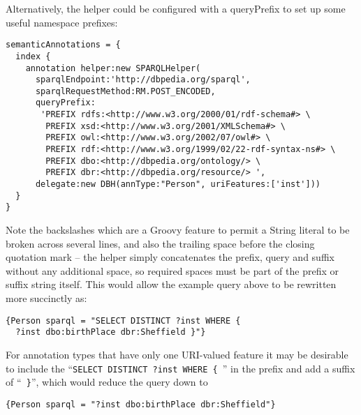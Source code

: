 Alternatively, the helper could be configured with a queryPrefix to set up some
useful namespace prefixes:
\begin{lstlisting}[texcl, breaklines, breakindent=150pt]
semanticAnnotations = {
  index {
    annotation helper:new SPARQLHelper(
      sparqlEndpoint:'http://dbpedia.org/sparql',
      sparqlRequestMethod:RM.POST_ENCODED,
      queryPrefix:
       'PREFIX rdfs:<http://www.w3.org/2000/01/rdf-schema#> \
        PREFIX xsd:<http://www.w3.org/2001/XMLSchema#> \
        PREFIX owl:<http://www.w3.org/2002/07/owl#> \
        PREFIX rdf:<http://www.w3.org/1999/02/22-rdf-syntax-ns#> \
        PREFIX dbo:<http://dbpedia.org/ontology/> \
        PREFIX dbr:<http://dbpedia.org/resource/> ',
      delegate:new DBH(annType:"Person", uriFeatures:['inst']))
  }
}
\end{lstlisting}

Note the backslashes which are a Groovy feature to permit a String literal to
be broken across several lines, and also the trailing space before the closing
quotation mark -- the helper simply concatenates the prefix, query and suffix
without any additional space, so required spaces must be part of the prefix or
suffix string itself.  This would allow the example query above to be rewritten
more succinctly as:
\begin{verbatim}
{Person sparql = "SELECT DISTINCT ?inst WHERE {
  ?inst dbo:birthPlace dbr:Sheffield }"}
\end{verbatim}

For annotation types that have only one URI-valued feature it may be desirable
to include the ``\verb!SELECT DISTINCT ?inst WHERE { !'' in the prefix and add
a suffix of ``\verb! }!'', which would reduce the query down to
\begin{verbatim}
{Person sparql = "?inst dbo:birthPlace dbr:Sheffield"}
\end{verbatim}

